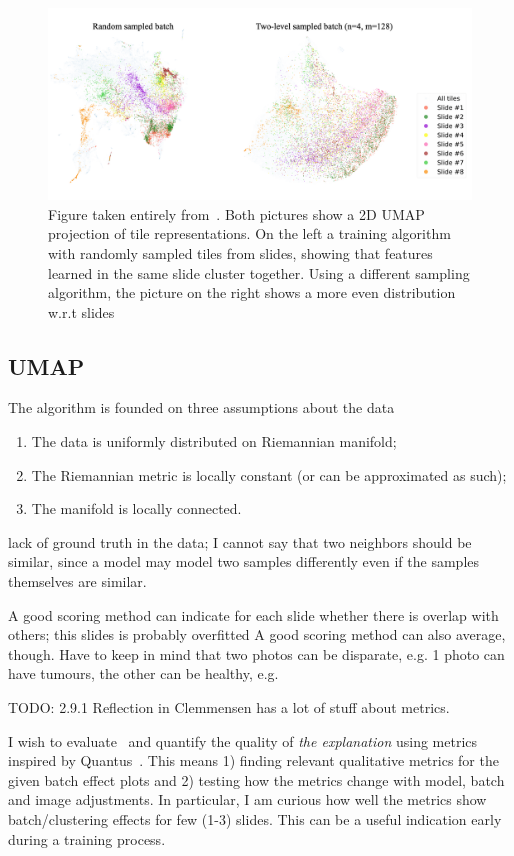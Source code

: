 \documentclass[10pt,twocolumn,letterpaper]{article}
\begin{document}
\begin{figure}
  \includegraphics[scale=.17]{./umap.png}
  \caption{Figure taken entirely from~\cite{sslUMAP}. Both pictures show a 2D UMAP projection of tile representations. On the left a training algorithm with randomly sampled tiles from slides, showing that features learned in the same slide cluster together. Using a different sampling algorithm, the picture on the right shows a more even distribution w.r.t slides}
  \label{fig:umap}
\end{figure}

\subsection{UMAP}
 The algorithm is founded on three assumptions about the data
 \begin{enumerate}
   \item The data is uniformly distributed on Riemannian manifold;
   \item The Riemannian metric is locally constant (or can be approximated as such);
   \item The manifold is locally connected.
 \end{enumerate}

lack of ground truth in the data; I cannot say that two neighbors should be similar, since a model may model two samples differently even if the samples themselves are similar.

A good scoring method can indicate for each slide whether there is overlap with others; this slides is probably overfitted
A good scoring method can also average, though.
Have to keep in mind that two photos can be disparate, e.g. 1 photo can have tumours, the other can be healthy, e.g.

TODO: 2.9.1 Reflection in Clemmensen has a lot of stuff about metrics.


I wish to evaluate~\cite{sslUMAP} and quantify the quality of \textit{the explanation} using metrics inspired by Quantus~\cite{hedstrom2022quantus}. This means 1) finding relevant qualitative metrics for the given batch effect plots and 2) testing how the metrics change with model, batch and image adjustments. In particular, I am curious how well the metrics show batch/clustering effects for few (1-3) slides. This can be a useful indication early during a training process.

{\small


}
\end{document}
